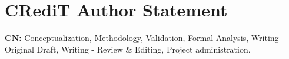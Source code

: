 \section*{CRediT Author Statement}

    \textbf{CN:} Conceptualization, Methodology, Validation, Formal Analysis, Writing - Original
    Draft, Writing - Review \& Editing, Project administration.


